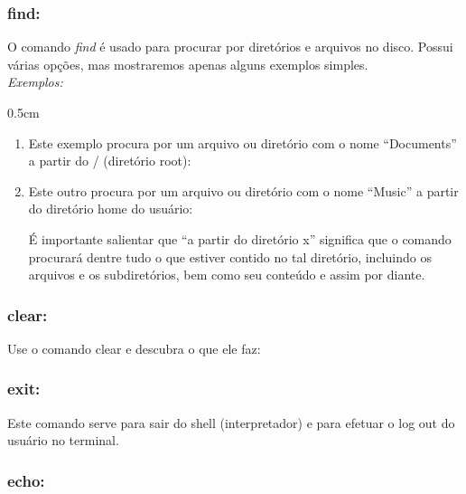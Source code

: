 \begin{refsection}
\subsubsection{find:}\label{tut1:text_mode:commands:find}

O comando \textit{find} é usado para procurar por diretórios e arquivos no disco. Possui várias opções, mas mostraremos apenas alguns exemplos simples.\\

\textit{Exemplos:}
\begin {myindentpar}{0.5cm}
\begin{enumerate}[\itshape i.]

\item{Este exemplo procura por um arquivo ou diretório com o nome ``Documents'' a partir do / (diretório root):}
\\

\item{Este outro procura por um arquivo ou diretório com o nome ``Music'' a partir do diretório home do usuário:}
\\

 É importante salientar que ``a partir do diretório x'' significa que o comando procurará dentre tudo o que estiver contido no tal diretório, incluindo os arquivos e os subdiretórios, bem como seu conteúdo e assim por diante.\\
\end{enumerate}
\end{myindentpar}


\subsubsection{clear:}\label{tut1:text_mode:commands:clear}

 Use o comando clear e descubra o que ele faz:\\

\subsubsection{exit:}\label{tut1:text_mode:commands:exit}

 Este comando serve para sair do shell (interpretador) e para efetuar o log out do usuário no terminal.\\
\subsubsection{echo:}\label{tut1:text_mode:commands:echo}


\end{refsection}
